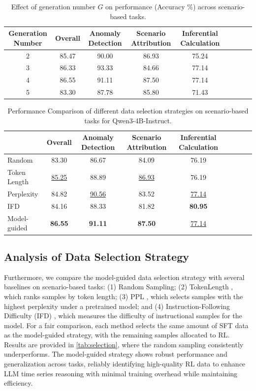 \documentclass{article}
\theoremstyle{plain}
\theoremstyle{definition}
\theoremstyle{remark}
\begin{document}
\begin{table}[htbp]
\centering
\footnotesize
\caption{Effect of generation number \(G\) on performance (Accuracy \%) across scenario-based tasks.}
\label{tab:gene_setting}
\begin{tabular}{ccccccccc}
\toprule
 \textbf{Generation Number} & \textbf{Overall} & \textbf{Anomaly Detection} & \textbf{Scenario Attribution} & \textbf{Inferential Calculation} \\
\midrule
2 & 85.47 & 90.00 & 86.93 & 75.24 \\
3 & 86.33 & 93.33 & 84.66 & 77.14 \\
4 & 86.55 & 91.11 & 87.50 & 77.14 \\
5 & 83.30 & 87.78 & 85.80 & 71.43 \\
\bottomrule
\end{tabular}
\end{table}

\begin{table}[htbp]
\centering
\footnotesize
\caption{Performance Comparison of different data selection strategies on scenario-based tasks for Qwen3-4B-Instruct.}
\label{tab:selection}
\begin{tabular}{lcccccccc}
\toprule
 & \textbf{Overall} & \textbf{Anomaly Detection} & \textbf{Scenario Attribution} & \textbf{Inferential Calculation} \\
\midrule
Random & 83.30 & 86.67 & 84.09 & 76.19 \\
Token Length & \underline{85.25} & 88.89 & \underline{86.93} & 76.19 \\
Perplexity & 84.82 & \underline{90.56} & 83.52 & \underline{77.14} \\
IFD & 84.16 & 88.33 & 81.82 & \textbf{80.95} \\
\rowcolor{cyan!10} Model-guided & \textbf{86.55} & \textbf{91.11} & \textbf{87.50} & \underline{77.14} \\
\bottomrule
\end{tabular}
\vspace{-1em}
\end{table}

\subsection{Analysis of Data Selection Strategy}
\label{apdx:data_selection}
Furthermore, we compare the model-guided data selection strategy with several baselines on scenario-based tasks: (1) Random Sampling; (2) TokenLength \cite{xia2024tokenlength}, which ranks samples by token length; (3) PPL \cite{2022ppl}, which selects samples with the highest perplexity under a pretrained model; and (4) Instruction-Following Difficulty (IFD) \cite{li2024IFD}, which measures the difficulty of instructional samples for the model. For a fair comparison, each method selects the same amount of SFT data as the model-guided strategy, with the remaining samples allocated to RL. Results are provided in \autoref{tab:selection}, where the random sampling consistently underperforms. The model-guided strategy shows robust performance and generalization across tasks, reliably identifying high-quality RL data to enhance LLM time series reasoning with minimal training overhead while maintaining efficiency. 
\end{document}
